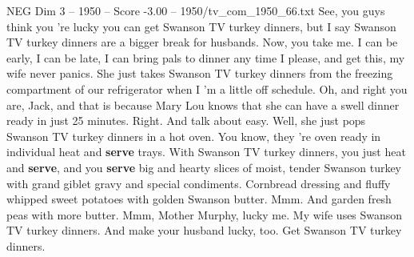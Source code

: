 \begin{textsample}{NEG Dim 3 – 1950 – Score -3.00 – 1950/tv\_com\_1950\_66.txt}  \label{ex:f3_neg_083}
See, you guys think you 're lucky you can get Swanson TV turkey dinners, but I say Swanson TV turkey dinners are a bigger break for husbands.
Now, you take me.
I can be early, I can be late, I can bring pals to dinner any time I please, and get this, my wife never panics.
She just takes Swanson TV turkey dinners from the freezing compartment of our refrigerator when I 'm a little off schedule.
Oh, and right you are, Jack, and that is because Mary Lou knows that she can have a swell dinner ready in just 25 minutes.
Right.
And talk about easy.
Well, she just pops Swanson TV turkey dinners in a hot oven.
You know, they 're oven ready in individual heat and \textbf{serve} trays.
With Swanson TV turkey dinners, you just heat and \textbf{serve}, and you \textbf{serve} big and hearty slices of moist, tender Swanson turkey with grand giblet gravy and special condiments.
Cornbread dressing and fluffy whipped sweet potatoes with golden Swanson butter.
Mmm.
And garden fresh peas with more butter.
Mmm, Mother Murphy, lucky me.
My wife uses Swanson TV turkey dinners.
And make your husband lucky, too.
Get Swanson TV turkey dinners.

\end{textsample}
